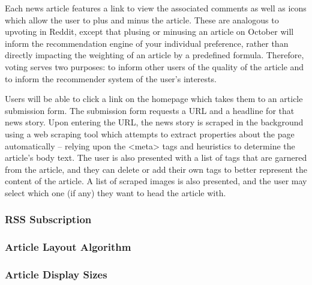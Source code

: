 \documentclass[11pt,letterpaper]{article}
\begin{document}
Each news article features a link to view the associated comments as well as icons which allow the user to plus and minus the article.
These are analogous to upvoting in Reddit, except that plusing or minusing an article on October will inform the recommendation engine of your individual preference, rather than directly impacting the weighting of an article by a predefined formula.
Therefore, voting serves two purposes: to inform other users of the quality of the article and to inform the recommender system of the user's interests.

Users will be able to click a link on the homepage which takes them to an article submission form.
The submission form requests a URL and a headline for that news story.
Upon entering the URL, the news story is scraped in the background using a web scraping tool which attempts to extract properties about the page automatically -- relying upon the <meta> tags and heuristics to determine the article's body text. The user is also presented with a list of tags that are garnered from the article, and they can delete or add their own tags to better represent the content of the article. A list of scraped images is also presented, and the user may select which one (if any) they want to head the article with. 

\subsubsection{RSS Subscription}
\label{sec:frontendrss}

\subsubsection{Article Layout Algorithm}

\subsubsection{Article Display Sizes}
\end{document}
